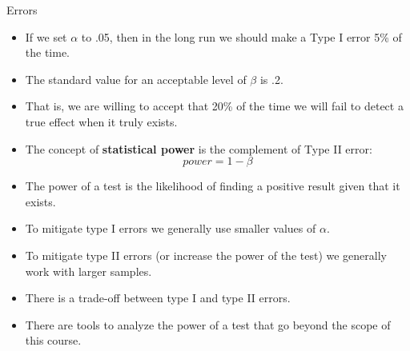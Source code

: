 \documentclass[handout]{beamer}
\begin{document}
\begin{frame}{Errors}
 \scriptsize{

\begin{itemize}
 \item If we set $\alpha$ to .05, then in the long run we should make a Type I error 5\% of the time. 
 \item The standard value for an acceptable level of $\beta$ is .2.
 \item That is, we are willing to accept that 20\% of the time we will fail to detect a true effect when it truly exists.
  \item The concept of \textbf{statistical power} is the complement of Type II error: 
  \begin{displaymath}                                                                               
 power = 1 - \beta                                                                                      \end{displaymath}

  
 \item The power of a test is the likelihood of finding a positive result given that it exists.\cite{poldrack2019statistical}
 
 \item To mitigate type I errors we generally use smaller values of $\alpha$.
 \item To mitigate type II errors (or increase the power of the test) we generally work with larger samples.
 \item There is a trade-off between type I and type II errors. 
 \item There are tools to analyze the power of a test that go beyond the scope of this course.
\end{itemize}



}
\end{frame}
\end{document}
